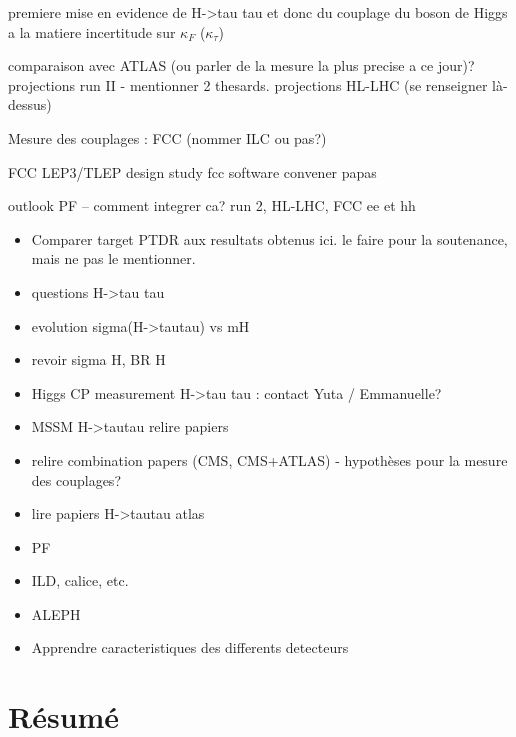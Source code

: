 \documentclass[11pt,twoside,a4paper,tdr]{cms-tdr}
\begin{document}
premiere mise en evidence de H->tau tau et donc du couplage du boson de Higgs a la matiere
incertitude sur $\kappa_F$ ($\kappa_\tau$)

comparaison avec ATLAS (ou parler de la mesure la plus precise a ce jour)? 
projections run II - mentionner 2 thesards. 
projections HL-LHC (se renseigner là-dessus)

Mesure des couplages : FCC (nommer ILC ou pas?) 

FCC 
LEP3/TLEP 
design study 
fcc software convener
papas 

outlook PF -- comment integrer ca? 
run 2, HL-LHC, FCC ee et hh 

\begin{itemize}
\item Comparer target PTDR aux resultats obtenus ici. le faire pour la soutenance, mais ne pas le mentionner. 
\item questions H->tau tau 
\item evolution sigma(H->tautau) vs mH
\item revoir sigma H, BR H
\item  Higgs CP measurement H->tau tau : contact Yuta / Emmanuelle? 
\item   MSSM H->tautau relire papiers
\item   relire combination papers (CMS, CMS+ATLAS) - hypothèses pour la mesure des couplages? 
\item   lire papiers H->tautau atlas
\item PF 
\item   ILD, calice, etc.
\item  ALEPH 
\item   Apprendre caracteristiques des differents detecteurs
\end{itemize}

\newpage 

\section*{Résumé}
\end{document}
